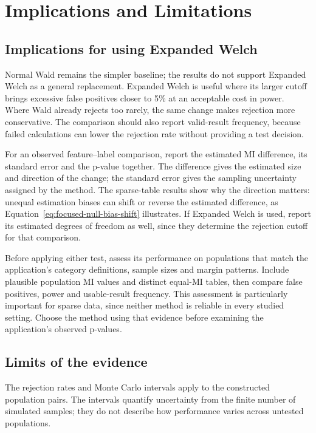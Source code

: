 \chapter{Implications and Limitations}
\label{chap:discussion}

\section{Implications for using Expanded Welch}

Normal Wald remains the simpler baseline; the results do not support
Expanded Welch as a general replacement. Expanded Welch is useful where
its larger cutoff brings excessive false positives closer to 5\% at
an acceptable cost in power. Where Wald already rejects too rarely,
the same change makes rejection more conservative. The comparison
should also report valid-result frequency, because failed calculations
can lower the rejection rate without providing a test decision.

For an observed feature--label comparison, report the estimated MI
difference, its standard error and the p-value together. The difference
gives the estimated size and direction of the change; the standard error
gives the sampling uncertainty assigned by the method. The sparse-table
results show why the direction matters: unequal estimation biases can
shift or reverse the estimated difference, as
Equation~\eqref{eq:focused-null-bias-shift} illustrates. If Expanded
Welch is used, report its estimated degrees of freedom as well, since
they determine the rejection cutoff for that comparison.

Before applying either test, assess its performance on populations that
match the application's category definitions, sample sizes and margin
patterns. Include plausible population MI values and distinct equal-MI
tables, then compare false positives, power and usable-result frequency.
This assessment is particularly important for sparse data, since neither
method is reliable in every studied setting. Choose the method using
that evidence before examining the application's observed p-values.

\begin{samepage}
\section{Limits of the evidence}

The rejection rates and Monte Carlo intervals apply to the constructed
population pairs. The intervals quantify uncertainty from the finite number
of simulated samples; they do not describe how performance varies across
untested populations.
\par
\end{samepage}

